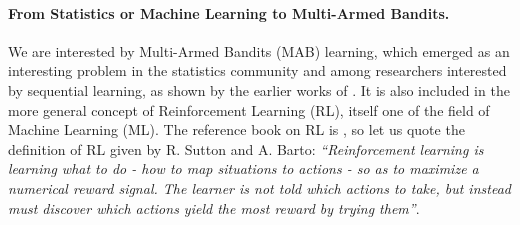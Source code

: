 \paragraph{From Statistics or Machine Learning to Multi-Armed Bandits.}
%
We are interested by Multi-Armed Bandits (MAB) learning,
which emerged as an interesting problem in the statistics community and among researchers interested by sequential learning, as shown by the earlier works of \cite{Thompson33,Robbins52,LaiRobbins85}.
It is also included in the more general concept of Reinforcement Learning (RL), itself one of the field of Machine Learning (ML).
%
The reference book on RL is \cite{SuttonBarto2018}, so let us quote the definition of RL given by R. Sutton and A. Barto:
\emph{``Reinforcement learning is learning what to do - how to map situations to actions - so
as to maximize a numerical reward signal. The learner is not told which actions to
take, but instead must discover which actions yield the most reward by trying them''}.






